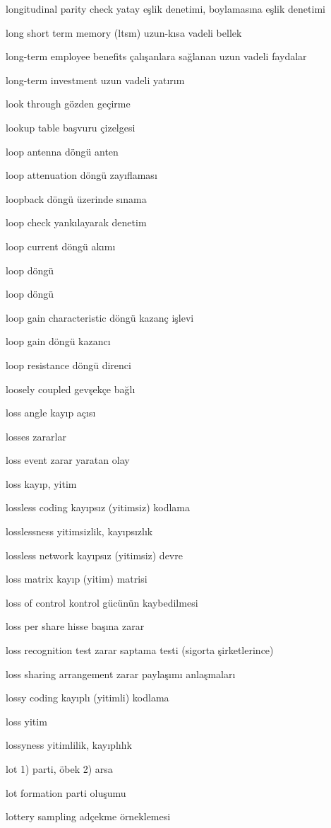 \documentclass[12pt,fleqn]{article}\usepackage{../../common}
\begin{document}
longitudinal parity check yatay eşlik denetimi, boylamasına eşlik denetimi

long short term memory (ltsm) uzun-kısa vadeli bellek

long-term employee benefits çalışanlara sağlanan uzun vadeli faydalar

long-term investment uzun vadeli yatırım

look through gözden geçirme

lookup table başvuru çizelgesi

loop antenna döngü anten

loop attenuation döngü zayıflaması

loopback döngü üzerinde sınama

loop check yankılayarak denetim

loop current döngü akımı

loop döngü

loop döngü

loop gain characteristic döngü kazanç işlevi

loop gain döngü kazancı

loop resistance döngü direnci

loosely coupled gevşekçe bağlı

loss angle kayıp açısı

losses zararlar

loss event zarar yaratan olay

loss kayıp, yitim

lossless coding kayıpsız (yitimsiz) kodlama

losslessness yitimsizlik, kayıpsızlık

lossless network kayıpsız (yitimsiz) devre

loss matrix kayıp (yitim) matrisi

loss of control kontrol gücünün kaybedilmesi

loss per share hisse başına zarar

loss recognition test zarar saptama testi (sigorta şirketlerince)

loss sharing arrangement zarar paylaşımı anlaşmaları

lossy coding kayıplı (yitimli) kodlama

loss yitim

lossyness yitimlilik, kayıplılık

lot 1) parti, öbek 2) arsa

lot formation parti oluşumu

lottery sampling adçekme örneklemesi
\end{document}
